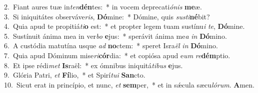 {2.~}Fiant aures tuæ in\textit{ten}\textbf{dén}tes:~* in vocem deprecati\textit{ó}\textit{nis} \textbf{me}æ.\\
{3.~}Si iniquitátes observáve\textit{ris}, \textbf{Dó}mine:~* Dómine, quis \textit{su}\textit{sti}\textbf{né}bit?\\
{4.~}Quia apud te propitiá\textit{ti}\textbf{o} est:~* et propter legem tuam sustínu\textit{i} \textit{te}, \textbf{Dó}mine.\\
{5.~}Sustínuit ánima mea in ver\textit{bo} \textbf{e}jus:~* sperávit ánima me\textit{a} \textit{in} \textbf{Dó}mino.\\
{6.~}A custódia matutína usque \textit{ad} \textbf{no}ctem:~* speret Isra\textit{ël} \textit{in} \textbf{Dó}mino.\\
{7.~}Quia apud Dóminum mise\textit{ri}\textbf{cór}dia:~* et copiósa apud e\textit{um} \textit{re}\textbf{dém}ptio.\\
{8.~}Et ipse rédi\textit{met} \textbf{Is}raël:~* ex ómnibus iniquitá\textit{ti}\textit{bus} \textbf{e}jus.\\
{9.~}Glória Patri, \textit{et} \textbf{Fí}lio,~* et Spirí\textit{tu}\textit{i} \textbf{San}cto.\\
{10.~}Sicut erat in princípio, et nunc, \textit{et} \textbf{sem}per,~* et in sǽcula sæcu\textit{ló}\textit{rum}. \textbf{A}men.\\
